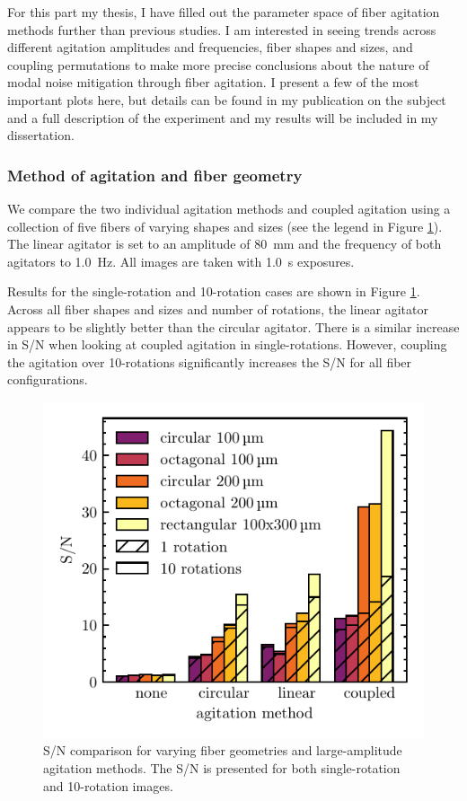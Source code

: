 \documentclass[11pt]{article}
\begin{document}
For this part my thesis, I have filled out the parameter space of fiber agitation methods further than previous studies. I am interested in seeing trends across different agitation amplitudes and frequencies, fiber shapes and sizes, and coupling permutations to make more precise conclusions about the nature of modal noise mitigation through fiber agitation. I present a few of the most important plots here, but details can be found in my publication on the subject \citep{Petersburg2018} and a full description of the experiment and my results will be included in my dissertation.

\subsubsection{Method of agitation and fiber geometry}

We compare the two individual agitation methods and coupled agitation using a collection of five fibers of varying shapes and sizes (see the legend in Figure \ref{fig:ag_snr}). The linear agitator is set to an amplitude of \SI{80}{\milli\meter} and the frequency of both agitators to \SI{1.0}{\hertz}. All images are taken with \SI{1.0}{\second} exposures.

Results for the single-rotation and 10-rotation cases are shown in Figure \ref{fig:ag_snr}. Across all fiber shapes and sizes and number of rotations, the linear agitator appears to be slightly better than the circular agitator. There is a similar increase in S/N when looking at coupled agitation in single-rotations. However, coupling the agitation over 10-rotations significantly increases the S/N for all fiber configurations.

\begin{figure}
\centering
	\includegraphics[width=0.5\columnwidth]{images/ag_snr.pdf}
	\caption{S/N comparison for varying fiber geometries and large-amplitude agitation methods. The S/N is presented for both single-rotation and 10-rotation images.}
\label{fig:ag_snr}
\end{figure}
\end{document}

